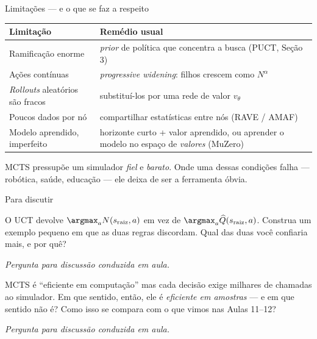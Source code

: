 \documentclass[aspectratio=169, 11pt]{beamer}
\newcommand{\paradiscussao}{\smallskip
  {\footnotesize\color{rlCinza}\itshape Pergunta para discussão conduzida em aula.}}
\newcommand{\Nv}[1]{N(#1)}                      %
\newcommand{\Qh}{\widehat{Q}}                   %
\newcommand{\raiz}{s_{\mathrm{raiz}}}
\begin{document}
\begin{frame}{Limitações --- e o que se faz a respeito}
  \centering
  {\small
  \begin{tabular}{@{}p{4.3cm}p{7.4cm}@{}}
    \toprule
    \textbf{Limitação} & \textbf{Remédio usual} \\
    \midrule
    Ramificação enorme &
      \emph{prior} de política que concentra a busca (PUCT, Seção 3) \\
    Ações contínuas &
      \emph{progressive widening}: filhos crescem como $N^{\alpha}$ \\
    \emph{Rollouts} aleatórios são fracos &
      substituí-los por uma rede de valor $v_\theta$ \\
    Poucos dados por nó &
      compartilhar estatísticas entre nós (RAVE / AMAF) \\[-0.1em]
    Modelo aprendido, imperfeito &
      horizonte curto + valor aprendido, ou aprender o modelo no espaço de
      \emph{valores} (MuZero) \\
    \bottomrule
  \end{tabular}}

  \vspace{0.3em}
  \raggedright
  \begin{alertabox}
    MCTS pressupõe um simulador \emph{fiel} e \emph{barato}. Onde uma dessas
    condições falha --- robótica, saúde, educação --- ele deixa de ser a
    ferramenta óbvia.
  \end{alertabox}
\end{frame}

\begin{frame}{Para discutir}
  \begin{quizbox}{}
    O UCT devolve $\argmax_a \Nv{\raiz,a}$ em vez de $\argmax_a \Qh(\raiz,a)$.
    Construa um exemplo pequeno em que as duas regras discordam. Qual das duas
    você confiaria mais, e por quê?
  \end{quizbox}
  \paradiscussao

  \pause
  \vfill
  \begin{quizbox}{}
    MCTS é ``eficiente em computação'' mas cada decisão exige milhares de
    chamadas ao simulador. Em que sentido, então, ele é \emph{eficiente em
    amostras} --- e em que sentido não é? Como isso se compara com o que vimos
    nas Aulas 11--12?
  \end{quizbox}
  \paradiscussao
\end{frame}
\end{document}
